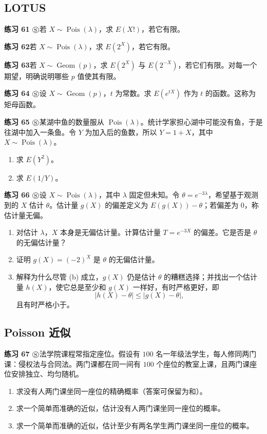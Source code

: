 \documentclass[UTF8,12pt,a4paper,fontset=fandol]{ctexart}
\begin{document}
\subsection*{LOTUS}

\noindent\textbf{练习 61 $\circledS$}\quad 若 $X\sim\operatorname{Pois}(\lambda)$，求 $E(X!)$，若它有限。

\noindent\textbf{练习 62}\quad 若 $X\sim\operatorname{Pois}(\lambda)$，求 $E(2^X)$，若它有限。

\noindent\textbf{练习 63}\quad 若 $X\sim\operatorname{Geom}(p)$，求 $E(2^X)$ 与 $E(2^{-X})$，若它们有限。对每一个期望，明确说明哪些 $p$ 值使其有限。

\noindent\textbf{练习 64 $\circledS$}\quad 设 $X\sim\operatorname{Geom}(p)$，$t$ 为常数。求 $E(e^{tX})$ 作为 $t$ 的函数。这称为矩母函数。

\noindent\textbf{练习 65 $\circledS$}\quad 某湖中鱼的数量服从 $\operatorname{Pois}(\lambda)$。统计学家担心湖中可能没有鱼，于是往湖中加入一条鱼。令 $Y$ 为加入后的鱼数，所以 $Y=1+X$，其中 $X\sim\operatorname{Pois}(\lambda)$。
\begin{enumerate}
  \item[(a)] 求 $E(Y^2)$。
  \item[(b)] 求 $E(1/Y)$。
\end{enumerate}

\noindent\textbf{练习 66 $\circledS$}\quad 设 $X\sim\operatorname{Pois}(\lambda)$，其中 $\lambda$ 固定但未知。令 $\theta=e^{-3\lambda}$，希望基于观测到的 $X$ 估计 $\theta$。估计量 $g(X)$ 的偏差定义为 $E(g(X))-\theta$；若偏差为 $0$，称估计量无偏。
\begin{enumerate}
  \item[(a)] 对估计 $\lambda$，$X$ 本身是无偏估计量。计算估计量 $T=e^{-3X}$ 的偏差。它是否是 $\theta$ 的无偏估计量？
  \item[(b)] 证明 $g(X)=(-2)^X$ 是 $\theta$ 的无偏估计量。
  \item[(c)] 解释为什么尽管 (b) 成立，$g(X)$ 仍是估计 $\theta$ 的糟糕选择；并找出一个估计量 $h(X)$，使它总是至少和 $g(X)$ 一样好，有时严格更好，即
  \[
    |h(X)-\theta|\le |g(X)-\theta|,
  \]
  且有时严格小于。
\end{enumerate}

\subsection*{Poisson 近似}

\noindent\textbf{练习 67 $\circledS$}\quad 法学院课程常指定座位。假设有 $100$ 名一年级法学生，每人修同两门课：侵权法与合同法。两门课都在同一间有 $100$ 个座位的教室上课，且两门课座位安排独立、均匀随机。
\begin{enumerate}
  \item[(a)] 求没有人两门课坐同一座位的精确概率（答案可保留为和）。
  \item[(b)] 求一个简单而准确的近似，估计没有人两门课坐同一座位的概率。
  \item[(c)] 求一个简单而准确的近似，估计至少有两名学生两门课坐同一座位的概率。
\end{enumerate}
\end{document}

